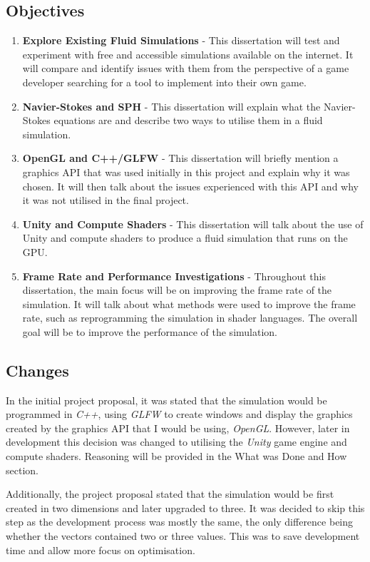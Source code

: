 \documentclass[a4paper, 12pt]{article}
\begin{document}
    \subsection{Objectives}
    \begin{enumerate}
        \item \textbf{Explore Existing Fluid Simulations} - This dissertation will test and experiment with free and accessible simulations available on the internet. It will compare and identify issues with them from the perspective of a game developer searching for a tool to implement into their own game.
        \item \textbf{Navier-Stokes and SPH} - This dissertation will explain what the Navier-Stokes equations are and describe two ways to utilise them in a fluid simulation.
        \item \textbf{OpenGL and C++/GLFW} - This dissertation will briefly mention a graphics API that was used initially in this project and explain why it was chosen. It will then talk about the issues experienced with this API and why it was not utilised in the final project.
        \item \textbf{Unity and Compute Shaders} - This dissertation will talk about the use of Unity and compute shaders to produce a fluid simulation that runs on the GPU.
        \item \textbf{Frame Rate and Performance Investigations} - Throughout this dissertation, the main focus will be on improving the frame rate of the simulation. It will talk about what methods were used to improve the frame rate, such as reprogramming the simulation in shader languages. The overall goal will be to improve the performance of the simulation.
    \end{enumerate}

    \subsection{Changes}
    In the initial project proposal, it was stated that the simulation would be programmed in \textit{C++}, using \textit{GLFW}\cite{glfw} to create windows and display the graphics created by the graphics API that I would be using, \textit{OpenGL}\cite{opengl}. However, later in development this decision was changed to utilising the \textit{Unity} game engine\cite{unity} and compute shaders. Reasoning will be provided in the What was Done and How section.

    Additionally, the project proposal stated that the simulation would be first created in two dimensions and later upgraded to three. It was decided to skip this step as the development process was mostly the same, the only difference being whether the vectors contained two or three values. This was to save development time and allow more focus on optimisation.
\end{document}
